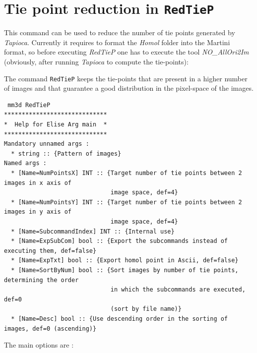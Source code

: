 \section{Tie point reduction in {\tt RedTieP}}


This command can be used to reduce the number of tie points generated by \textit{Tapioca}. Currently it requires to format the \textit{Homol} folder into the Martini format, so before executing \textit{RedTieP} one has to execute the tool \textit{NO\_AllOri2Im} (obviously, after running \textit{Tapioca} to compute the tie-points):

The command {\tt RedTieP} keeps the tie-points that are present in a higher number of images and that guarantee a good distribution in the pixel-space of the images. 

\begin{verbatim}
 mm3d RedTieP
*****************************
*  Help for Elise Arg main  *
*****************************
Mandatory unnamed args : 
  * string :: {Pattern of images}
Named args : 
  * [Name=NumPointsX] INT :: {Target number of tie points between 2 images in x axis of 
                              image space, def=4}
  * [Name=NumPointsY] INT :: {Target number of tie points between 2 images in y axis of 
                              image space, def=4}
  * [Name=SubcommandIndex] INT :: {Internal use}
  * [Name=ExpSubCom] bool :: {Export the subcommands instead of executing them, def=false}
  * [Name=ExpTxt] bool :: {Export homol point in Ascii, def=false}
  * [Name=SortByNum] bool :: {Sort images by number of tie points, determining the order 
                              in which the subcommands are executed, def=0 
                              (sort by file name)}
  * [Name=Desc] bool :: {Use descending order in the sorting of images, def=0 (ascending)}
\end{verbatim}

The main options are :

